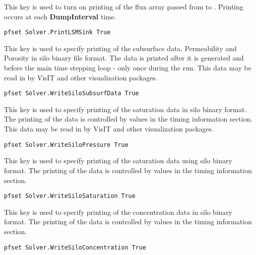 {
This key is used to turn on printing of the
flux array passed from  to \parflow{}.   Printing occurs at each {\bf DumpInterval} time. 
}
\begin{display}\begin{verbatim}
pfset Solver.PrintLSMSink True
\end{verbatim}\end{display}

{
This key is used to specify printing of the subsurface data,
Permeability and Porosity in silo binary file format.  The data is printed after it is
generated and before the main time stepping loop - only once
during the run.  This data may be read in by VisIT and other visualization packages.
}
\begin{display}\begin{verbatim}
pfset Solver.WriteSiloSubsurfData True
\end{verbatim}\end{display}

{
This key is used to specify printing of the saturation data in silo binary format.
The printing of the data is controlled by values in the
timing information section. This data may be read in by VisIT and other visualization packages.
}
\begin{display}\begin{verbatim}
pfset Solver.WriteSiloPressure True
\end{verbatim}\end{display}

{
This key is used to specify printing of the saturation data using silo binary format.
The printing of the data is controlled by values in the
timing information section.  
}
\begin{display}\begin{verbatim}
pfset Solver.WriteSiloSaturation True
\end{verbatim}\end{display}

{
This key is used to specify printing of the concentration data in silo binary format.
The printing of the data is controlled by values in the
timing information section.
}
\begin{display}\begin{verbatim}
pfset Solver.WriteSiloConcentration True
\end{verbatim}\end{display}

